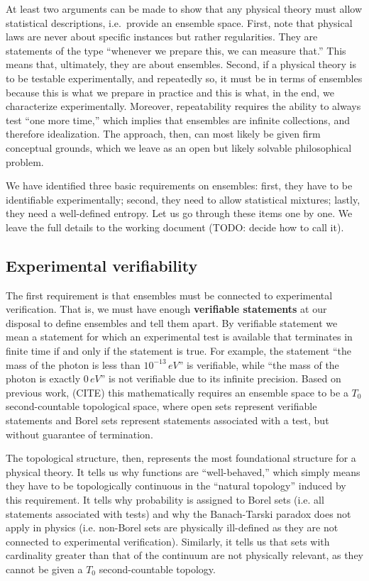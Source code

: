 \documentclass[10pt,twocolumn, nofootinbib]{revtex4-2}
\begin{document}
At least two arguments can be made to show that any physical theory must allow statistical descriptions, i.e.~provide an ensemble space. First, note that physical laws are never about specific instances but rather regularities. They are statements of the type ``whenever we prepare this, we can measure that.'' This means that, ultimately, they are about ensembles. Second, if a physical theory is to be testable experimentally, and repeatedly so, it must be in terms of ensembles because this is what we prepare in practice and this is what, in the end, we characterize experimentally. Moreover, repeatability requires the ability to always test ``one more time,'' which implies that ensembles are infinite collections, and therefore idealization. The approach, then, can most likely be given firm conceptual grounds, which we leave as an open but likely solvable philosophical problem.

We have identified three basic requirements on ensembles: first, they have to be identifiable experimentally; second, they need to allow statistical mixtures; lastly, they need a well-defined entropy. Let us go through these items one by one. We leave the full details to the working document (TODO: decide how to call it).

\subsection{Experimental verifiability}
The first requirement is that ensembles must be connected to experimental verification. That is, we must have enough \textbf{verifiable statements} at our disposal to define ensembles and tell them apart. By verifiable statement we mean a statement for which an experimental test is available that terminates in finite time if and only if the statement is true. For example, the statement ``the mass of the photon is less than $10^{-13} \, eV$'' is verifiable, while ``the mass of the photon is exactly $0 \, eV$'' is not verifiable due to its infinite precision. Based on previous work, (CITE) this mathematically requires an ensemble space to be a $T_0$ second-countable topological space, where open sets represent verifiable statements and Borel sets represent statements associated with a test, but without guarantee of termination.

The topological structure, then, represents the most foundational structure for a physical theory. It tells us why functions are ``well-behaved,'' which simply means they have to be topologically continuous in the ``natural topology'' induced by this requirement. It tells why probability is assigned to Borel sets (i.e. all statements associated with tests) and why the Banach-Tarski paradox does not apply in physics (i.e. non-Borel sets are physically ill-defined as they are not connected to experimental verification). Similarly, it tells us that sets with cardinality greater than that of the continuum are not physically relevant, as they cannot be given a $T_0$ second-countable topology.
\end{document}
